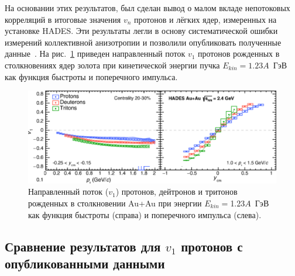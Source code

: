 На основании этих результатов, был сделан вывод о малом вкладе непотоковых корреляций в итоговые значения $v_n$ протонов и лёгких ядер, измеренных на установке HADES. 
Эти результаты легли в основу систематической ошибки измерений коллективной анизотропии и позволили опубликовать полученные данные~\cite{HADES:2020lob}.
На рис.~\ref{fig:hades_prl} приведен направленный поток $v_1$ протонов рожденных в столкновениях ядер золота при кинетической энергии пучка $E_{kin}=1.23A$~ГэВ как функция быстроты и поперечного импульса.
%
\begin{figure}[ht]
\begin{center}
\includegraphics[width=0.75\linewidth]{images/HADES_prl.png}
\caption{Направленный поток ($v_1$) протонов, дейтронов и тритонов  рожденных в столкновении Au+Au при энергии $E_{kin}=$1.23$A$~ГэВ как функция быстроты (справа) и поперечного импульса (слева).}
\label{fig:hades_prl}
\end{center}
\end{figure}

\subsection{Сравнение результатов для $v_1$ протонов с опубликованными данными}


